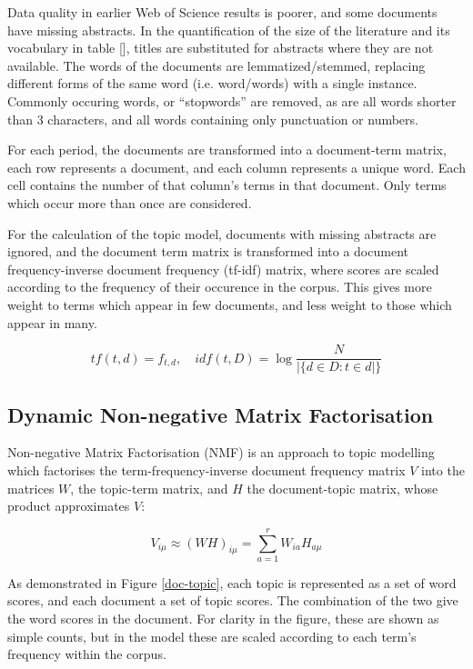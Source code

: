 \documentclass{article}
\begin{document}
\begin{linenumbers}
	Data quality in earlier Web of Science results is poorer, and some documents have missing abstracts. In the quantification of the size of the literature and its vocabulary in table [], titles are substituted for abstracts where they are not available.  The words of the documents are lemmatized/stemmed, replacing different forms of the same word (i.e. word/words) with a single instance. Commonly occuring words, or ``stopwords'' are removed, as are all words shorter than 3 characters, and all words containing only punctuation or numbers.
	
	For each period, the documents are transformed into a document-term matrix, each row represents a document, and each column represents a unique word.  Each cell contains the number of that column's terms in that document. Only terms which occur more than once are considered.
	
	For the calculation of the topic model, documents with missing abstracts are ignored, and the document term matrix is transformed into a document
	frequency-inverse document frequency (tf-idf) matrix, where scores are scaled according to the frequency of their occurence in the corpus. This gives more weight to terms which appear in few documents, and less weight to those which appear in many.
	
	\begin{equation}
	tf(t,d) = f_{t,d} \mathrm{,}\quad idf(t,D) = \log\frac{N}{|\{d \in D:t \in d|\}}
	\end{equation} 
	
	\subsection*{Dynamic Non-negative Matrix Factorisation}
	
	Non-negative Matrix Factorisation (NMF) is an approach to topic modelling which factorises the term-frequency-inverse document frequency matrix \( V \) into the matrices \(W\), the topic-term matrix, and \( H \) the document-topic matrix, whose product approximates \(V\):
	
	\begin{equation}
		V_{i\mu} \approx (WH)_{i\mu} = \sum_{a=1}^{r}W_{ia}H_{a\mu}
	\end{equation}
	
	As demonstrated in Figure \ref{doc-topic}, each topic is represented as a set of word scores, and each document a set of topic scores. The combination of the two give the word scores in the document. For clarity in the figure, these are shown as simple counts, but in the model these are scaled according to each term's frequency within the corpus.
	

\end{linenumbers}
\end{document}
